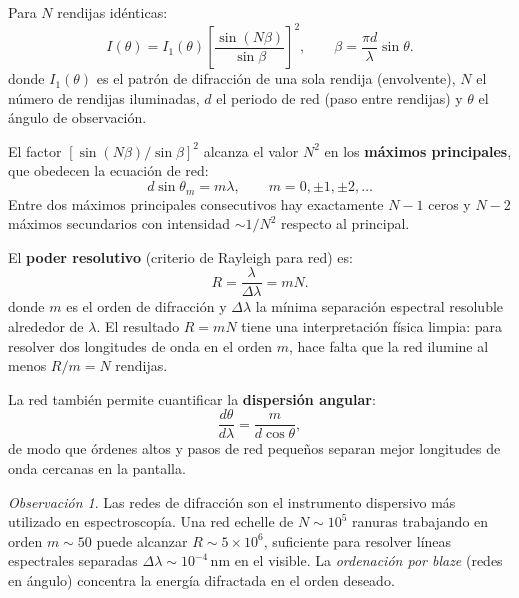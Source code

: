 \documentclass[12pt, a4paper]{article}
\theoremstyle{plain}
\theoremstyle{definition}
\theoremstyle{remark}
\newtheorem*{observacion}{Observación}
\begin{document}
Para $N$ rendijas idénticas:
\begin{equation}
  I(\theta)=I_1(\theta)
  \left[\frac{\sin(N\beta)}{\sin\beta}\right]^2,
  \qquad
  \beta=\frac{\pi d}{\lambda}\sin\theta.
  \label{eq:red_intensidad_t6}
\end{equation}
donde $I_1(\theta)$ es el patrón de difracción de una sola rendija (envolvente),
$N$ el número de rendijas iluminadas, $d$ el periodo de red (paso entre
rendijas) y $\theta$ el ángulo de observación.

El factor $[\sin(N\beta)/\sin\beta]^2$ alcanza el valor $N^2$ en los
\textbf{máximos principales}, que obedecen la ecuación de red:
\begin{equation}
  d\sin\theta_m=m\lambda, \qquad m = 0, \pm 1, \pm 2, \ldots
  \label{eq:red_ecuacion_t6}
\end{equation}
Entre dos máximos principales consecutivos hay exactamente $N-1$ ceros y
$N-2$ máximos secundarios con intensidad $\sim 1/N^2$ respecto al principal.

El \textbf{poder resolutivo} (criterio de Rayleigh para red) es:
\begin{equation}
  R=\frac{\lambda}{\Delta\lambda}=mN.
  \label{eq:red_resolucion_t6}
\end{equation}
donde $m$ es el orden de difracción y $\Delta\lambda$ la mínima separación
espectral resoluble alrededor de $\lambda$. El resultado $R = mN$ tiene una
interpretación física limpia: para resolver dos longitudes de onda en el
orden $m$, hace falta que la red ilumine al menos $R/m = N$ rendijas.

La red también permite cuantificar la \textbf{dispersión angular}:
\begin{equation}
  \frac{d\theta}{d\lambda}=\frac{m}{d\cos\theta},
  \label{eq:red_dispersion_t6}
\end{equation}
de modo que órdenes altos y pasos de red pequeños separan mejor longitudes
de onda cercanas en la pantalla.

\begin{observacion}
Las redes de difracción son el instrumento dispersivo más utilizado en
espectroscopía. Una red echelle de $N \sim 10^5$ ranuras trabajando en orden
$m \sim 50$ puede alcanzar $R \sim 5 \times 10^6$, suficiente para resolver
líneas espectrales separadas $\Delta\lambda \sim 10^{-4}\,\text{nm}$ en el
visible. La \emph{ordenación por blaze} (redes en ángulo) concentra la
energía difractada en el orden deseado.
\end{observacion}
\end{document}
